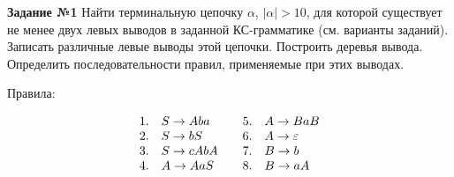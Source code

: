     \textbf{Задание №1} Найти терминальную цепочку $\alpha$, $|\alpha| > 10$, для которой существует не менее двух левых выводов в заданной КС-грамматике (см. варианты
    заданий). Записать различные левые выводы этой цепочки. Построить деревья вывода. Определить последовательности правил, применяемые при этих выводах. \label{sec:1}

    Правила:
    
    \[
    \begin{array}{ll@{\hspace{2em}}ll}
    1. & S \to Aba & 5. & A \to BaB \\
    2. & S \to bS  & 6. & A \to \varepsilon \\
    3. & S \to cAbA & 7. & B \to b \\
    4. & A \to AaS & 8. & B \to aA
    \end{array}
    \]

